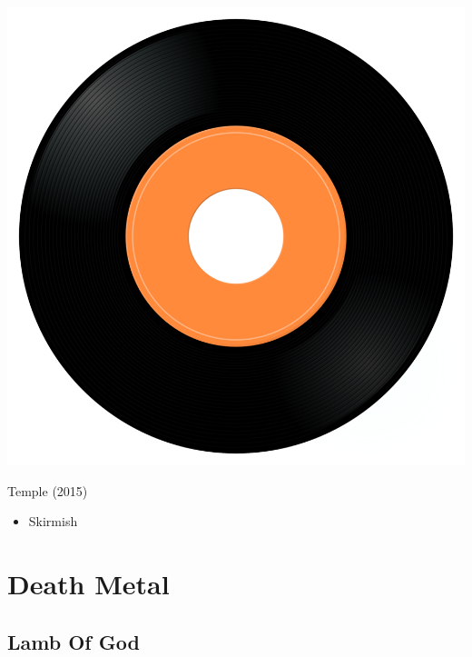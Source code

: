 \begin{minipage}[t]{0.25\textwidth}\vspace{0pt}
\captionsetup{type=figure}
\includegraphics[width=\textwidth]{Images/cover.png}
\caption*{Temple (2015)}
\end{minipage}
\begin{minipage}[t]{0.25\textwidth}\vspace{0pt}
\begin{itemize}[nosep,leftmargin=1em,labelwidth=*,align=left]
	\setlength{\itemsep}{0pt}
	\item Skirmish
\end{itemize}
\end{minipage}

\cleardoublepage
\section{Death Metal}

\subsection{Lamb Of God}

